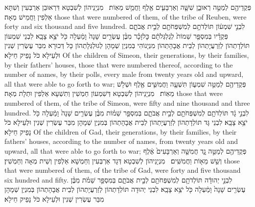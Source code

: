 {פְּקֻדֵיהֶ֖ם לְמַטֵּ֣ה רְאוּבֵ֑ן שִׁשָּׁ֧ה וְאַרְבָּעִ֛ים אֶ֖לֶף וַחֲמֵ֥שׁ מֵאֽוֹת׃ \petucha }
{מִנְיָנֵיהוֹן לְשִׁבְטָא דִּרְאוּבֵן אַרְבְּעִין וְשִׁתָּא אַלְפִין וַחֲמֵישׁ מְאָה׃}
{those that were numbered of them, of the tribe of Reuben, were forty and six thousand and five hundred.}{}
{לִבְנֵ֣י שִׁמְע֔וֹן תּוֹלְדֹתָ֥ם לְמִשְׁפְּחֹתָ֖ם לְבֵ֣ית אֲבֹתָ֑ם פְּקֻדָ֗יו בְּמִסְפַּ֤ר שֵׁמוֹת֙ לְגֻלְגְּלֹתָ֔ם כׇּל\maqqaf זָכָ֗ר מִבֶּ֨ן עֶשְׂרִ֤ים שָׁנָה֙ וָמַ֔עְלָה כֹּ֖ל יֹצֵ֥א צָבָֽא׃}
{לִבְנֵי שִׁמְעוֹן תּוֹלְדָתְהוֹן לְזַרְעֲיָתְהוֹן לְבֵית אֲבָהָתְהוֹן מִנְיָנוֹהִי בְּמִנְיַן שְׁמָהָן לְגוּלְגְּלָתְהוֹן כָּל דְּכוּרָא מִבַּר עֶשְׂרִין שְׁנִין וּלְעֵילָא כֹּל נָפֵיק חֵילָא׃}
{Of the children of Simeon, their generations, by their families, by their fathers’ houses, those that were numbered thereof, according to the number of names, by their polls, every male from twenty years old and upward, all that were able to go forth to war;}{}
{פְּקֻדֵיהֶ֖ם לְמַטֵּ֣ה שִׁמְע֑וֹן תִּשְׁעָ֧ה וַחֲמִשִּׁ֛ים אֶ֖לֶף וּשְׁלֹ֥שׁ מֵאֽוֹת׃ \petucha }
{מִנְיָנֵיהוֹן לְשִׁבְטָא דְּשִׁמְעוֹן חַמְשִׁין וְתִשְׁעָא אַלְפִין וּתְלָת מְאָה׃}
{those that were numbered of them, of the tribe of Simeon, were fifty and nine thousand and three hundred.}{}
{לִבְנֵ֣י גָ֔ד תּוֹלְדֹתָ֥ם לְמִשְׁפְּחֹתָ֖ם לְבֵ֣ית אֲבֹתָ֑ם בְּמִסְפַּ֣ר שֵׁמ֗וֹת מִבֶּ֨ן עֶשְׂרִ֤ים שָׁנָה֙ וָמַ֔עְלָה כֹּ֖ל יֹצֵ֥א צָבָֽא׃}
{לִבְנֵי גָּד תּוֹלְדָתְהוֹן לְזַרְעֲיָתְהוֹן לְבֵית אֲבָהָתְהוֹן בְּמִנְיַן שְׁמָהָן מִבַּר עֶשְׂרִין שְׁנִין וּלְעֵילָא כֹּל נָפֵיק חֵילָא׃}
{Of the children of Gad, their generations, by their families, by their fathers’ houses, according to the number of names, from twenty years old and upward, all that were able to go forth to war;}{}
{פְּקֻדֵיהֶ֖ם לְמַטֵּ֣ה גָ֑ד חֲמִשָּׁ֤ה וְאַרְבָּעִים֙ אֶ֔לֶף וְשֵׁ֥שׁ מֵא֖וֹת וַחֲמִשִּֽׁים׃ \petucha }
{מִנְיָנֵיהוֹן לְשִׁבְטָא דְּגָד אַרְבְּעִין וְחַמְשָׁא אַלְפִין וְשֵׁית מְאָה וְחַמְשִׁין׃}
{those that were numbered of them, of the tribe of Gad, were forty and five thousand six hundred and fifty.}{}
{לִבְנֵ֣י יְהוּדָ֔ה תּוֹלְדֹתָ֥ם לְמִשְׁפְּחֹתָ֖ם לְבֵ֣ית אֲבֹתָ֑ם בְּמִסְפַּ֣ר שֵׁמֹ֗ת מִבֶּ֨ן עֶשְׂרִ֤ים שָׁנָה֙ וָמַ֔עְלָה כֹּ֖ל יֹצֵ֥א צָבָֽא׃}
{לִבְנֵי יְהוּדָה תּוֹלְדָתְהוֹן לְזַרְעֲיָתְהוֹן לְבֵית אֲבָהָתְהוֹן בְּמִנְיַן שְׁמָהָן מִבַּר עֶשְׂרִין שְׁנִין וּלְעֵילָא כֹּל נָפֵיק חֵילָא׃}
